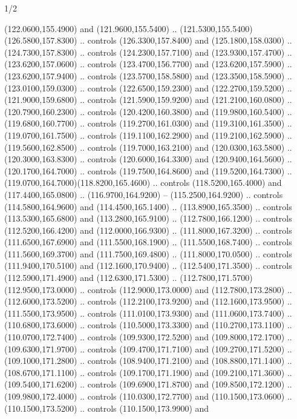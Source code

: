 \begin{flagdescription}{1/2}
\begin{scope}[xshift=\flaglength/6]
\begin{scope}[scale=0.00247\flagwidth,yshift=241mm,xshift=-27.1mm]
\begin{scope}[y=0.80pt, x=0.80pt, yscale=-0.9, xscale=1]
\begin{scope}[cm={{-1.0,0.0,0.0,1.0,(-107.89793,0.0)}},shift={(-300.0,0)}]
\begin{scope}[shift={(-53.94897,373.26853)},draw=red]
  (122.0600,155.4900) and (121.9600,155.5400) ..
  (121.5300,155.5400)(126.5800,157.8300) .. controls (126.3300,157.8400) and
  (125.1800,158.0300) .. (124.7300,157.8300) .. controls (124.2300,157.7100) and
  (123.9300,157.4700) .. (123.6200,157.0600) .. controls (123.4700,156.7700) and
  (123.6200,157.5900) .. (123.6200,157.9400) .. controls (123.5700,158.5800) and
  (123.3500,158.5900) .. (123.0100,159.0300) .. controls (122.6500,159.2300) and
  (122.2700,159.5200) .. (121.9000,159.6800) .. controls (121.5900,159.9200) and
  (121.2100,160.0800) .. (120.7900,160.2300) .. controls (120.4200,160.3800) and
  (119.9800,160.5400) .. (119.6800,160.7700) .. controls (119.2700,161.0300) and
  (119.3100,161.3500) .. (119.0700,161.7500) .. controls (119.1100,162.2900) and
  (119.2100,162.5900) .. (119.5600,162.8500) .. controls (119.7000,163.2100) and
  (120.0300,163.5800) .. (120.3000,163.8300) .. controls (120.6000,164.3300) and
  (120.9400,164.5600) .. (120.1700,164.7000) .. controls (119.7500,164.8600) and
  (119.5200,164.7300) .. (119.0700,164.7000)(118.8200,165.4600) .. controls
  (118.5200,165.4000) and (117.4400,165.0800) .. (116.9700,164.9200) --
  (115.2500,164.9200) .. controls (114.5800,164.9600) and (114.4500,165.1400) ..
  (113.8900,165.3500) .. controls (113.5300,165.6800) and (113.2800,165.9100) ..
  (112.7800,166.1200) .. controls (112.5200,166.4200) and (112.0000,166.9300) ..
  (111.8000,167.3200) .. controls (111.6500,167.6900) and (111.5500,168.1900) ..
  (111.5500,168.7400) .. controls (111.5600,169.3700) and (111.7500,169.4800) ..
  (111.8000,170.0500) .. controls (111.9400,170.5100) and (112.1600,170.9400) ..
  (112.5400,171.3500) .. controls (112.5900,171.4900) and (112.6300,171.5300) ..
  (112.7800,171.5700)(112.9500,173.0000) .. controls (112.9000,173.0000) and
  (112.7800,173.2800) .. (112.6000,173.5200) .. controls (112.2100,173.9200) and
  (112.1600,173.9500) .. (111.5500,173.9500) .. controls (111.0100,173.9300) and
  (111.0600,173.7400) .. (110.6800,173.6000) .. controls (110.5000,173.3300) and
  (110.2700,173.1100) .. (110.0700,172.7400) .. controls (109.9300,172.5200) and
  (109.8000,172.1700) .. (109.6300,171.9700) .. controls (109.4700,171.7100) and
  (109.2700,171.5200) .. (109.1000,171.2800) .. controls (108.9400,171.2100) and
  (108.8800,171.1400) .. (108.6700,171.1100) .. controls (109.1700,171.1900) and
  (109.2100,171.3600) .. (109.5400,171.6200) .. controls (109.6900,171.8700) and
  (109.8500,172.1200) .. (109.9800,172.4000) .. controls (110.0300,172.7700) and
  (110.1500,173.0600) .. (110.1500,173.5200) .. controls (110.1500,173.9900) and

\end{scope}
\end{scope}
\end{scope}
\end{scope}
\end{scope}
\end{flagdescription}
